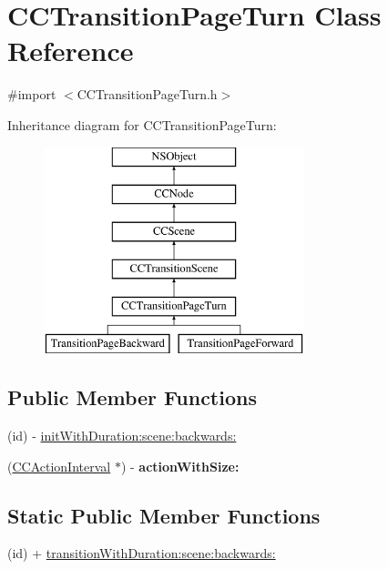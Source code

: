 \hypertarget{interface_c_c_transition_page_turn}{\section{C\-C\-Transition\-Page\-Turn Class Reference}
\label{interface_c_c_transition_page_turn}
}


{\ttfamily \#import $<$C\-C\-Transition\-Page\-Turn.\-h$>$}

Inheritance diagram for C\-C\-Transition\-Page\-Turn\-:\begin{figure}[H]
\begin{center}
\leavevmode
\includegraphics[height=6.000000cm]{interface_c_c_transition_page_turn}
\end{center}
\end{figure}
\subsection*{Public Member Functions}
\begin{DoxyCompactItemize}
\item 
(id) -\/ \hyperlink{interface_c_c_transition_page_turn_a617c5e20d13ca2117373cdabde162b15}{init\-With\-Duration\-:scene\-:backwards\-:}
\item 
\hypertarget{interface_c_c_transition_page_turn_aae9a5e13a1fe692fb7cc717308847578}{(\hyperlink{class_c_c_action_interval}{C\-C\-Action\-Interval} $\ast$) -\/ {\bfseries action\-With\-Size\-:}}\label{interface_c_c_transition_page_turn_aae9a5e13a1fe692fb7cc717308847578}

\end{DoxyCompactItemize}
\subsection*{Static Public Member Functions}
\begin{DoxyCompactItemize}
\item 
(id) + \hyperlink{interface_c_c_transition_page_turn_a9f81d4c154edb0a9d82368c0f6c03ea2}{transition\-With\-Duration\-:scene\-:backwards\-:}
\end{DoxyCompactItemize}
